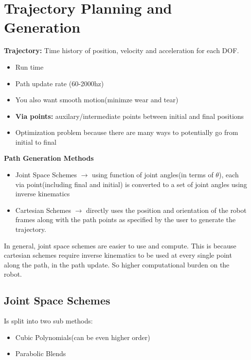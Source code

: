 \documentclass{article}
\begin{document}
\section{Trajectory Planning and Generation}
\textbf{Trajectory:} Time history of position, velocity and acceleration for each DOF.\\
\begin{itemize}
    \item Run time
    \item Path update rate (60-2000hz)
    \item You also want smooth motion(minimze wear and tear)
    \item \textbf{Via points:} auxilary/intermediate points between initial and final positions
    \item Optimization problem because there are many ways to potentially go from initial to final
\end{itemize}

\textbf{Path Generation Methods}
\begin{itemize}
    \item Joint Space Schemes $\rightarrow$ using function of joint angles(in terms of $\theta$),  each via point(including final and initial) is converted to a set of joint angles using inverse kinematics
    \item Cartesian Schemes $\rightarrow$ directly uses the position and orientation of the robot frames along with the path points as specified by the user to generate the trajectory.
\end{itemize}
In general, joint space schemes are easier to use and compute. This is because cartesian schemes require inverse kinematics to be used at every single point along the path, in the path update. So higher computational burden on the robot. 

\subsection{Joint Space Schemes}
Is split into two sub methods:
\begin{itemize}
    \item Cubic Polynomials(can be even higher order)
    \item Parabolic Blends
\end{itemize}
\end{document}
